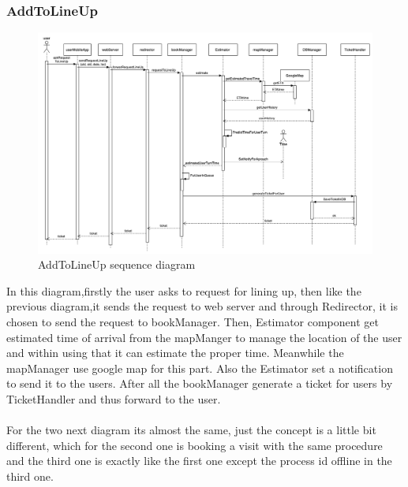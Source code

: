 \subsubsection{AddToLineUp}
\begin{figure}[H]
  \centering
  \includegraphics[width=0.9\textheight, angle=90, keepaspectratio]{images/sequences/AddToLineUp.png}
  \caption{AddToLineUp sequence diagram}
\end{figure}
\vspace{2cm}
In this diagram,firstly the user asks to request for lining up, then like the previous diagram,it sends the request to web server and through Redirector, it is chosen to send the request to bookManager. Then, Estimator component get estimated time of arrival from the mapManger to manage the location of the user and within using that it can estimate the proper time. Meanwhile the mapManager use google map for this part. Also the Estimator set a notification to send it to the users. After all the bookManager generate a ticket for users by TicketHandler and thus forward to the user.\\ \\

For the two next diagram its almost the same, just the concept is a little bit different, which for the second one is booking a visit with the same procedure and the third one is exactly like the first one except the process id offline in the third one.

